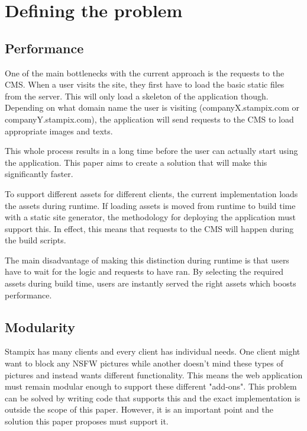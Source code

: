 
\chapter{Defining the problem} %

\label{Chapter2} 


\section{Performance}

One of the main bottlenecks with the current approach is the requests to the CMS. When a user visits the site, they first have to load the basic static files from the server. 
This will only load a skeleton of the application though. Depending on what domain name the user is visiting (companyX.stampix.com or companyY.stampix.com), the application will send requests to the CMS to load appropriate images and texts.

This whole process results in a long time before the user can actually start using the application. This paper aims to create a solution that will make this significantly faster.

To support different assets for different clients, the current implementation loads the assets during runtime. 
If loading assets is moved from runtime to build time with a static site generator, the methodology for deploying the application must support this. 
In effect, this means that requests to the CMS will happen during the build scripts.

The main disadvantage of making this distinction during runtime is that users have to wait for the logic and requests to have ran.
By selecting the required assets during build time, users are instantly served the right assets which boosts performance.

\section{Modularity}

Stampix has many clients and every client has individual needs. One client might want to block any NSFW pictures while another doesn't mind these types of pictures and instead wants different functionality.
This means the web application must remain modular enough to support these different "add-ons". This problem can be solved by writing code that supports this and the exact implementation is outside the scope of this paper. 
However, it is an important point and the solution this paper proposes must support it.


